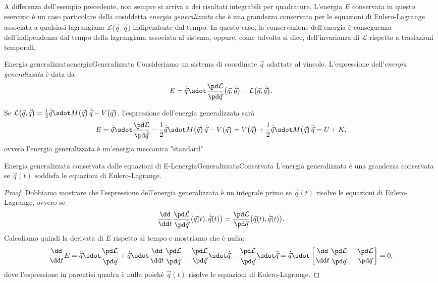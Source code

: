 \begin{oss}
	A differenza dell'esempio precedente, non sempre si arriva a dei risultati integrabili per quadrature.
	L'energia \(E\) conservata in questo esercizio è un caso particolare della cosiddetta \emph{energia generalizzata} che è una grandezza conservata per le equazioni di Eulero-Lagrange associata a qualsiasi lagrangiana \(\mathcal{L}\big(\vec{q},\dot{\vec{q}}\big)\) indipendente dal tempo.
	In questo caso, la conservazione dell'energia è conseguenza dell'indipendenza dal tempo della lagrangiana associata al sistema, oppure, come talvolta si dice, dell'invarianza di \(\mathcal{L}\) rispetto a traslazioni temporali.
\end{oss}

\begin{defn}{Energia generalizzata}{energiaGeneralizzata}
	Consideriamo un sistema di coordinate \(\vec{q}\) adattate al vincolo. L'espressione dell'\emph{energia generalizzata} è data da
	\[
		E = \dot{\vec{q}} \sdot \frac{\pd\mathcal{L}}{\pd\dot{\vec{q}}}\big(\vec{q},\dot{\vec{q}}\big) - \mathcal{L}\big(\vec{q},\dot{\vec{q}}\big).
	\]
\end{defn}

\begin{oss}
	Se \(\mathcal{L}\big(\vec{q},\dot{\vec{q}}\big) = \frac{1}{2}\dot{\vec{q}}\sdot M\big(\vec{q}\big)\,\dot{\vec{q}} - V\big(\vec{q}\big)\), l'espressione dell'energia generalizzata sarà
	\[
		E = \dot{\vec{q}}\sdot \frac{\pd\mathcal{L}}{\pd\dot{\vec{q}}} - \frac{1}{2}\dot{\vec{q}}\sdot M\big(\vec{q}\big)\,\dot{\vec{q}} - V\big(\vec{q}\big) = V\big(\vec{q}\big) + \frac{1}{2}\dot{\vec{q}}\sdot M\big(\vec{q}\big)\,\dot{\vec{q}} = U+K, 
	\]
	ovvero l'energia generalizzata è un'energia meccanica "standard"
\end{oss}

\begin{prop}{Energia generalizzata conservata dalle equazioni di E-L}{energiaGeneralizzataConservata}
	L'energia generalizzata è una grandezza conservata se \(\vec{q}(t)\) soddisfa le equazioni di Eulero-Lagrange.
\end{prop}

\begin{proof}
	Dobbiamo mostrare che l'espressione dell'energia generalizzata è un integrale primo se \(\vec{q}(t)\) risolve le equazioni di Eulero-Lagrange, ovvero se
	\[
		\frac{\dd}{\dd t}\frac{\pd\mathcal{L}}{\pd\dot{\vec{q}}}\big(\vec{q}(t),\dot{\vec{q}}(t)\big) = \frac{\pd\mathcal{L}}{\pd\vec{q}}\big(\vec{q}(t),\dot{\vec{q}}(t)\big).
	\]
	Calcoliamo quindi la derivata di \(E\) rispetto al tempo e mostriamo che è nulla:
	\[
		\frac{\dd}{\dd t}E = \ddot{\vec{q}}\sdot \frac{\pd\mathcal{L}}{\pd\dot{\vec{q}}} + \dot{\vec{q}}\sdot \frac{\dd}{\dd t}\frac{\pd\mathcal{L}}{\pd\dot{\vec{q}}} - \frac{\pd\mathcal{L}}{\pd\vec{q}}\sdot \dot{\vec{q}} - \frac{\pd\mathcal{L}}{\pd\dot{\vec{q}}}\sdot\ddot{\vec{q}} = \dot{\vec{q}}\sdot \left[\frac{\dd}{\dd t}\frac{\pd\mathcal{L}}{\pd\dot{\vec{q}}}-\frac{\pd\mathcal{L}}{\pd\vec{q}}\right] = 0,
	\]
	dove l'espressione in parentisi quadra è nulla poiché \(\vec{q}(t)\) risolve le equazioni di Eulero-Lagrange.
\end{proof}